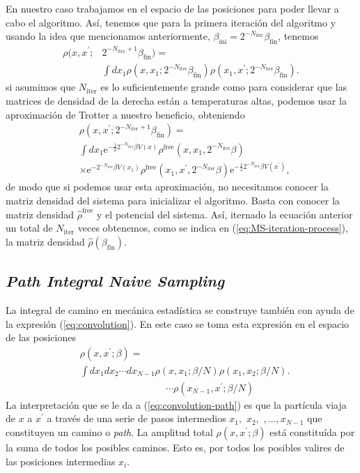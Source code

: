 \documentclass[%
 reprint,
 amsmath,amssymb,
 aps,
 pra,
]{revtex4-2}
\begin{document}
En nuestro caso trabajamos en el espacio de las posiciones para poder llevar a cabo el algoritmo. Así, tenemos que para la primera iteración del algoritmo y usando la idea que mencionamos anteriormente, $\beta_{\mathrm{ini}} =  2^{-N_{\mathrm{iter}}}\beta_{\mathrm{fin}}$, tenemos
\begin{align}
	\rho (x,x^{\prime};&2^{-N_{\mathrm{iter}}+1}\beta_{\mathrm{fin}}) = \nonumber \\
	&\int dx_1 \rho (x,x_1;2^{-N_{\mathrm{iter}}}\beta_{\mathrm{fin}})\rho (x_1,x^{\prime};2^{-N_{\mathrm{iter}}}\beta_{\mathrm{fin}}). \label{eq:MS-first-iter}
\end{align}
si asumimos que $N_{\mathrm{iter}}$ es lo suficientemente grande como para considerar que las matrices de densidad de la derecha están a temperaturas altas, podemos usar la aproximación de Trotter a nuestro beneficio, obteniendo
\begin{align}
	&\rho (x,x^{\prime};2^{-N_{\mathrm{iter}}+1}\beta_{\mathrm{fin}}) = \nonumber \\
	&\int dx_1 \mathrm{e}^{-\frac{1}{2} 2^{-N_{\mathrm{iter}}} \beta V(x)} \rho^{\mathrm{free}}\left(x, x_1, 2^{-N_{\mathrm{iter}}}\beta\right)  \nonumber \\
	& \times  \mathrm{e}^{- 2^{-N_{\mathrm{iter}}}\beta V\left(x_1\right)}  \rho^{\mathrm{free}}\left(x_1, x^{\prime}, 2^{-N_{\mathrm{iter}}} \beta\right) \mathrm{e}^{-\frac{1}{2} 2^{-N_{\mathrm{iter}}} \beta V\left(x^{\prime}\right)},
\end{align}
de modo que si podemos usar esta aproximación, no necesitamos conocer la matriz densidad del sistema para inicializar el algoritmo. Basta con conocer la matriz densidad $\hat{\rho}^{\mathrm{free}}$ y el potencial del sistema. Así, iternado la ecuación anterior un total de $N_{\mathrm{iter}}$ veces obtenemos, como se indica en (\ref{eq:MS-iteration-process}), la matriz densidad $\hat{\rho}(\beta_\mathrm{fin})$.


\subsection{\textit{Path Integral Naive Sampling}\label{subsec:PathInt}} 
La integral de camino en mecánica estadística se construye también con ayuda de la expresión (\ref{eq:convolution}). En este caso se toma esta expresión en el espacio de las posiciones
\begin{align}
	& \rho (x, x^{\prime}; \beta) = \nonumber \\
	& \int dx_1 dx_2 \cdots dx_{N-1} \rho (x,x_1; \beta/N) \rho (x_1,x_2; \beta/N). \nonumber \\
	& \,\,\,\,\,\,\,\,\,\,\,\,\,\,\,\,\,\,\,\,\,\,\,\,\,\,\,\,\,\,\,\,\,\,\,\,\,\,\,\,\,\,\,\,\,\,\,\,\,\,\,\,\, \cdots \rho (x_{N-1},x^{\prime}; \beta/N) \label{eq:convolution-path}
\end{align}
La interpretación que se le da a (\ref{eq:convolution-path}) es que la partícula viaja de $x$ a $x^\prime$ a través de una serie de pasos intermedios $x_1,\,\,x_2,\,\,, \dots, x_{N-1}$ que constituyen un camino o \textit{path}. La amplitud total $\rho (x, x^{\prime}; \beta)$ está constituída por la suma de todos los posibles caminos. Esto es, por todos los posibles valires de las posiciones intermedias $x_i$.
\end{document}
